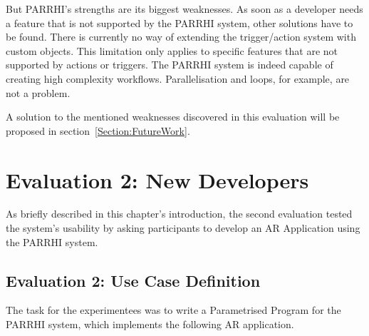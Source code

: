 But PARRHI's strengths are its biggest weaknesses. As soon as a developer needs a feature that is not supported by the PARRHI system, other solutions have to be found. There is currently no way of extending the trigger/action system with custom objects. This limitation only applies to specific features that are not supported by actions or triggers. The PARRHI system is indeed capable of creating high complexity workflows. Parallelisation and loops, for example, are not a problem.

A solution to the mentioned weaknesses discovered in this evaluation will be proposed in section~\ref{Section:FutureWork}.

\section{Evaluation 2: New Developers}
As briefly described in this chapter's introduction, the second evaluation tested the system's usability by asking participants to develop an AR Application using the PARRHI system.

\subsection{Evaluation 2: Use Case Definition}\label{Section:Evluation2UseCase}
The task for the experimentees was to write a Parametrised Program for the PARRHI system, which implements the following AR application.

\FloatBarrier

